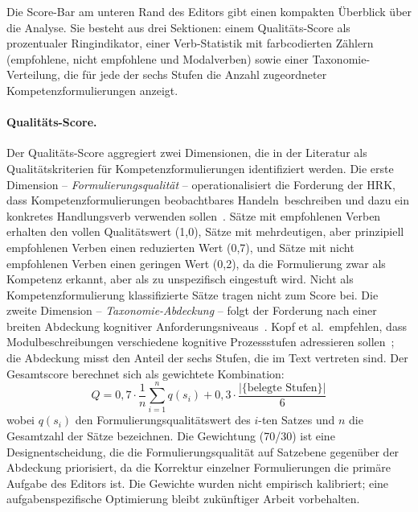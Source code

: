 Die Score-Bar am unteren Rand des Editors gibt einen kompakten Überblick über die Analyse.
Sie besteht aus drei Sektionen: einem Qualitäts-Score als prozentualer Ringindikator, einer Verb-Statistik mit farbcodierten Zählern (empfohlene, nicht empfohlene und Modalverben) sowie einer Taxonomie-Verteilung, die für jede der sechs Stufen die Anzahl zugeordneter Kompetenzformulierungen anzeigt.

\paragraph{Qualitäts-Score.}

Der Qualitäts-Score aggregiert zwei Dimensionen, die in der Literatur als Qualitätskriterien für Kompetenzformulierungen identifiziert werden.
Die erste Dimension -- \emph{Formulierungsqualität} -- operationalisiert die Forderung der HRK, dass Kompetenzformulierungen \glqq beobachtbares Handeln\grqq\ beschreiben und dazu ein konkretes Handlungsverb verwenden sollen~\cite{hrknexus2015lernergebnisse}.
Sätze mit empfohlenen Verben erhalten den vollen Qualitätswert (1{,}0), Sätze mit mehrdeutigen, aber prinzipiell empfohlenen Verben einen reduzierten Wert (0{,}7), und Sätze mit nicht empfohlenen Verben einen geringen Wert (0{,}2), da die Formulierung zwar als Kompetenz erkannt, aber als zu unspezifisch eingestuft wird.
Nicht als Kompetenzformulierung klassifizierte Sätze tragen nicht zum Score bei.
Die zweite Dimension -- \emph{Taxonomie-Abdeckung} -- folgt der Forderung nach einer breiten Abdeckung kognitiver Anforderungsniveaus~\cite{anderson2001taxonomy}.
Kopf et al.\ empfehlen, dass Modulbeschreibungen verschiedene kognitive Prozessstufen adressieren sollen~\cite{kopf2010kompetenzen}; die Abdeckung misst den Anteil der sechs Stufen, die im Text vertreten sind.
Der Gesamtscore berechnet sich als gewichtete Kombination:
\begin{equation}\label{eq:score}
Q = 0{,}7 \cdot \frac{1}{n} \sum_{i=1}^{n} q(s_i) + 0{,}3 \cdot \frac{|\{\text{belegte Stufen}\}|}{6}
\end{equation}
wobei $q(s_i)$ den Formulierungsqualitätswert des $i$-ten Satzes und $n$ die Gesamtzahl der Sätze bezeichnen.
Die Gewichtung (70/30) ist eine Designentscheidung, die die Formulierungsqualität auf Satzebene gegenüber der Abdeckung priorisiert, da die Korrektur einzelner Formulierungen die primäre Aufgabe des Editors ist.
Die Gewichte wurden nicht empirisch kalibriert; eine aufgabenspezifische Optimierung bleibt zukünftiger Arbeit vorbehalten.

